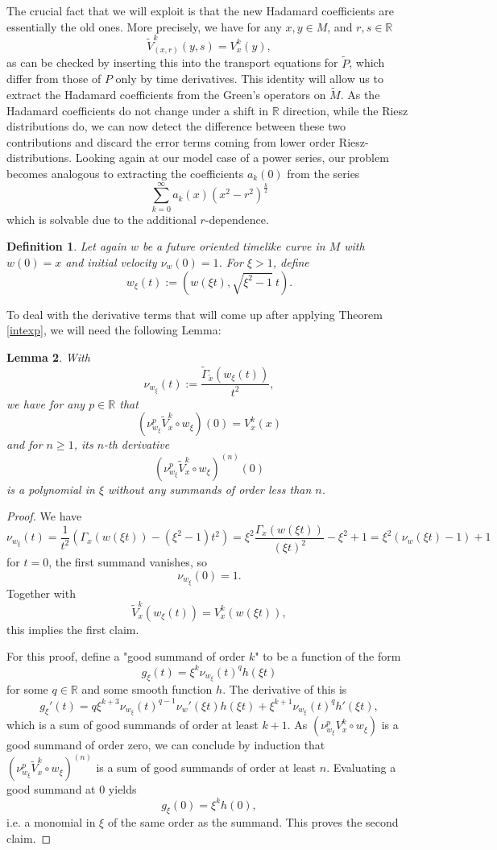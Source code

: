 \documentclass[11pt]{article}
\def\R{{\mathbb{R}}}
\def\insum#1{\sum\limits_{#1=0}^\infty}
\newtheorem{df}{Definition}[section]
\newtheorem{lemma}[df]{Lemma}
\begin{document}
The crucial fact that we will exploit is that the new Hadamard coefficients are essentially the old ones. More precisely, we have for any $x,y\in M$, and $r,s\in \R$
\[\tilde V^k_{(x,r)}(y,s)=V^k_x(y),\]
as can be checked by inserting this into the transport equations for $\tilde P$, which differ from those of $P$ only by time derivatives.
This identity will allow us to extract the Hadamard coefficients from the Green's operators on $\tilde M$. As the Hadamard coefficients do not change under a shift in $\R$ direction, while the Riesz distributions do, we can now detect the difference between these two contributions and discard the error terms coming from lower order Riesz-distributions. Looking again at our model case of a power series, our problem becomes analogous to extracting the coefficients $a_k(0)$ from the series
\[\insum k a_k(x)(x^2-r^2)^\frac{k}{2}\]
which is solvable due to the additional $r$-dependence.
\begin{df}
	Let again $w$ be a future oriented timelike curve in $M$ with $w(0)=x$ and initial velocity $\nu_w (0)=1$. For $\xi>1$, define
	\[w_\xi(t):=(w(\xi t), \sqrt{\xi^2-1}\ t).\]
\end{df}
To deal with the derivative terms that will come up after applying Theorem \ref{intexp}, we will need the following Lemma:
\begin{lemma}
	\label{xidiff}
	With
	\[\nu_{w_\xi}(t):=\frac{\tilde \Gamma_{\tilde x}(w_\xi(t))}{t^2},\]
	we have for any $p\in \R$ that
	\[(\nu_{w_\xi}^p \tilde V^k_x\circ w_\xi)(0)=V^k_x(x)\]
	and for $n\geq 1$, its  $n$-th derivative
	\[(\nu_{w_\xi}^p \tilde V^k_x\circ w_\xi)^{(n)}(0)\]
	is a polynomial in $\xi$ without any summands of order less than $n$.
\end{lemma}
\begin{proof}
	We have
	\[\nu_{w_\xi}(t)=\frac{1}{t^2}(\Gamma_x(w(\xi t))-(\xi^2-1)t^2)=\xi^2 \frac{\Gamma_x(w(\xi t))}{(\xi t)^2}-\xi^2+1=\xi^2(\nu_w(\xi t)-1)+1\]
	for $t=0$, the first summand vanishes, so
	\[\nu_{w_\xi}(0)=1.\]
	Together with
	\[\tilde V^k_x(w_\xi(t))=V^k_x(w(\xi t)),\]
	this implies the first claim.
	
	For this proof, define a "good summand of order $k$" to be a function of the form
	\[g_\xi(t)=\xi^k \nu_{w_\xi}(t)^qh(\xi t)\]
	for some $q\in \R$ and some smooth function $h$. The derivative of this is
	\[g_\xi'(t)=q\xi^{k+3} \nu_{w_\xi}(t)^{q-1}\nu_w '(\xi t)h(\xi t)+\xi^{k+1} \nu_{w_\xi}(t)^qh'(\xi t),\]
	which is a sum of good summands of order at least $k+1$. As $(\nu_{w_\xi}^p V^k_x\circ w_\xi)$ is a good summand of order zero, we can conclude by induction that $(\nu_{w_\xi}^p \tilde V^k_x\circ w_\xi)^{(n)}$ is a sum of good summands of order at least $n$. Evaluating a good summand at $0$ yields
	\[g_\xi(0)=\xi^k h(0),\]
	i.e. a monomial in $\xi$ of the same order as the summand. This proves the second claim.
\end{proof}
\end{document}
